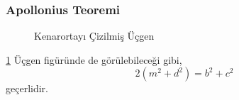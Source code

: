 \subsubsection{Apollonius Teoremi}
\begin{figure}[h!]
    \centering
    \caption{Kenarortayı Çizilmiş Üçgen}
    \label{fig:apoltrigwmedian}
\end{figure}

\ref{fig:apoltrigwmedian} Üçgen figüründe de görülebileceği gibi, 
\begin{equation}
    2(m^2 + d^2) = b^2 + c^2
\end{equation}
geçerlidir.